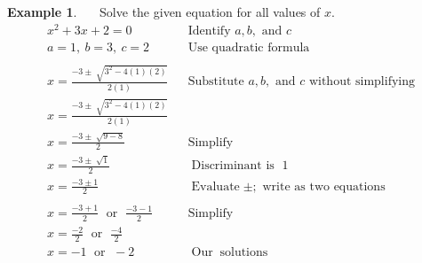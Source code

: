 \documentclass[12pt]{book}
\theoremstyle{definition}
\newtheorem{example}{Example}
\newcommand{\tmop}[1]{\ensuremath{\operatorname{#1}}}
\begin{document}
\begin{example}~~~Solve the given equation for all values of $x$.
  \begin{eqnarray*}
    x^2 + 3 x + 2 = 0 &  & \text{Identify~} a,b, \text{~and~}c\\
		a = 1,~ b = 3,~ c = 2 & & \text{Use \ quadratic \ formula}\\ 
		& & \\
    x = \frac{- 3 \pm \sqrt[]{3^2 - 4 (1) (2)}}{2 (1)} &  & \text{Substitute~} a,b, \text{~and~} c \text{~without~simplifying}\\
    x = \frac{- 3 \pm \sqrt[]{3^2 - 4 (1) (2)}}{2 (1)} &  & \\
    x = \frac{- 3 \pm \sqrt[]{9 - 8}}{2} &  & \tmop{Simplify}\\
    x = \frac{- 3 \pm \sqrt[]{1}}{2} &  & \tmop{Discriminant~is~}1\\
    x = \frac{- 3 \pm 1}{2} &  & \tmop{Evaluate} \pm; \text{~write as two equations}\\
& & \\
    x = \frac{- 3 + 1}{2} \tmop{~or~} \frac{- 3 - 1}{2}&  & \tmop{Simplify}\\
    x = \frac{- 2}{2} \tmop{~or~} \frac{- 4}{2} &  & \\
    x = - 1 \tmop{~or~} - 2 &  & \tmop{Our} \tmop{solutions}
  \end{eqnarray*}
\end{example}
\end{document}

